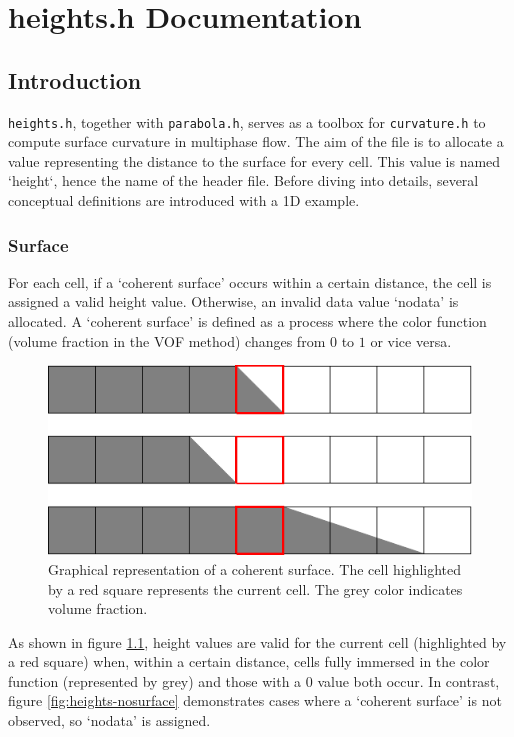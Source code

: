 \chapter{heights.h Documentation}
\ifsingle
\maketitle
\fi
\chaptermeta[2.0][2025-06-08]

\section{Introduction}\label{sec:heights-intro}
\texttt{heights.h}, together with \texttt{parabola.h}, serves as a toolbox for \texttt{curvature.h} to compute surface curvature in multiphase flow. The aim of the file is to allocate a value representing the distance to the surface for every cell. This value is named `height`, hence the name of the header file. Before diving into details, several conceptual definitions are introduced with a 1D example.

\subsection{Surface}
For each cell, if a `coherent surface' occurs within a certain distance, the cell is assigned a valid height value. Otherwise, an invalid data value `nodata' is allocated. A `coherent surface' is defined as a process where the color function (volume fraction in the VOF method)  changes from $0$ to $1$ or vice versa.

\begin{figure}[H]
  \centering
  \includegraphics{./image/heights-h/surface.pdf}
  \caption{Graphical representation of a coherent surface. The cell highlighted by a red square represents the current cell. The grey color indicates volume fraction.}
  \label{fig:heights-surface}
\end{figure}
As shown in figure \ref{fig:heights-surface}, height values are valid for the current cell (highlighted by a red square) when, within a certain distance, cells fully immersed in the color function (represented by grey) and those with a $0$ value both occur. In contrast, figure \ref{fig:heights-nosurface} demonstrates cases where a `coherent surface' is not observed, so `nodata' is assigned.


